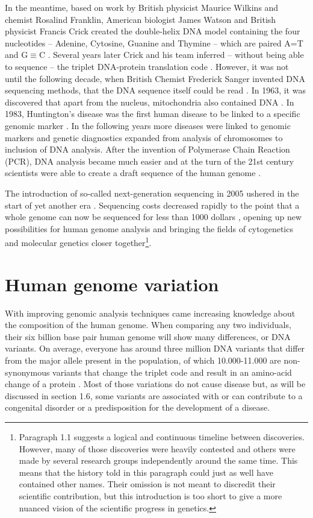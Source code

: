 In the meantime, based on work by British physicist Maurice Wilkins and chemist Rosalind Franklin, American biologist James Watson and British physicist Francis Crick created the double-helix DNA model containing the four nucleotides – Adenine, Cytosine, Guanine and Thymine – which are paired A=T and G$\equiv$C \cite{Watson_1953,Wilkins_1953,Franklin_1953}. 
Several years later Crick and his team inferred – without being able to sequence – the triplet DNA-protein translation code \cite{Crick_1961,Yanofsky_2007}. 
However, it was not until the following decade, when British Chemist Frederick Sanger invented DNA sequencing methods, that the DNA sequence itself could be read \cite{Sanger_1975,Sanger_1977}. 
In 1963, it was discovered that apart from the nucleus, mitochondria also contained DNA \cite{Nass_1963}. 
In 1983, Huntington’s disease was the first human disease to be linked to a specific genomic marker \cite{Gusella_1983}. 
In the following years more diseases were linked to genomic markers and genetic diagnostics expanded from analysis of chromosomes to inclusion of DNA analysis. 
After the invention of Polymerase Chain Reaction (PCR), DNA analysis became much easier \cite{Saiki_1985,Saiki_1988} and at the turn of the 21st century scientists were able to create a draft sequence of the human genome \cite{Lander_2001,Venter_2001}. 

The introduction of so-called next-generation sequencing in 2005 ushered in the start of yet another era \cite{Mardis_2013}. 
Sequencing costs decreased rapidly to the point that a whole genome can now be sequenced for less than 1000 dollars \cite{Goodwin_2016}, opening up new possibilities for human genome analysis and bringing the fields of cytogenetics and molecular genetics closer together\footnote{Paragraph 1.1 suggests a logical and continuous timeline between discoveries. However, many of those discoveries were heavily contested and others were made by several research groups independently around the same time. This means that the history told in this paragraph could just as well have contained other names. Their omission is not meant to discredit their scientific contribution, but this introduction is too short to give a more nuanced vision of the scientific progress in genetics.}. 



\section{Human genome variation} \label{intro_variation}
With improving genomic analysis techniques came increasing knowledge about the composition of the human genome. 
When comparing any two individuals, their six billion base pair human genome will show many differences, or DNA variants. On average, everyone has around three million DNA variants that differ from the major allele present in the population, of which 10.000-11.000 are non-synonymous variants that change the triplet code and result in an amino-acid change of a protein \cite{Durbin_2010}. 
Most of those variations do not cause disease but, as will be discussed in section 1.6, some variants are associated with or can contribute to a congenital disorder or a predisposition for the development of a disease. 

